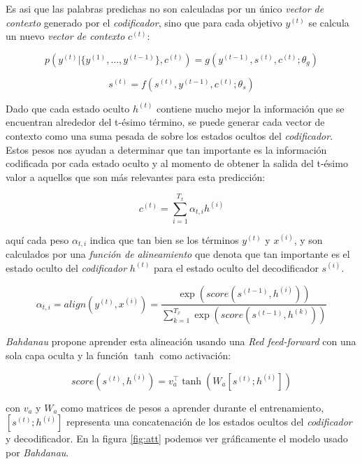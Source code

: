 Es asi que las palabras predichas no son calculadas por un único \textit{vector de contexto} generado por
el \textit{codificador}, sino que para cada objetivo $y^{(t)}$ se calcula un nuevo \textit{vector de contexto} $c^{(t)}$:

\begin{equation}
    p(y^{(t)} | \{y^{(1)}, \dots , y^{(t-1)}\}, c^{(t)}) = g(y^{(t-1)}, s^{(t)}, c^{(t)}; \theta_g)
\end{equation}

\begin{equation}
    s^{(t)} = f(s^{(t)}, y^{(t-1)}, c^{(t)}; \theta_s)
\end{equation}

Dado que cada estado oculto $h^{(t)}$ contiene mucho mejor la información que se encuentran alrededor
del t-ésimo término, se puede generar cada vector de contexto como una suma pesada de sobre los
estados ocultos del \textit{codificador}. Estos pesos nos ayudan a determinar que tan importante es la
información codificada por cada estado oculto y al momento de obtener la salida del t-ésimo valor
 a aquellos que son más relevantes para esta predicción:

\begin{equation}
    c^{(t)} = \sum_{i=1}^{T_x} \alpha_{t,i} h^{(i)}
\end{equation}

\noindent aquí cada peso $\alpha_{t,i}$ indica que tan bien se  los términos $y^{(t)}$ y $x^{(i)}$,
y son calculados por una \textit{función de alineamiento} que denota que tan importante es el estado
oculto del \textit{codificador} $h^{(t)}$ para el estado oculto del decodificador $s^{(i)}$.

\begin{equation}
    \alpha_{t,i} = align(y^{(t)}, x^{(i)}) = \frac{\exp(score(s^{(t-1)}, h^{(i)}))}{\sum_{k=1}^{T_x} \exp(score(s^{(t-1)}, h^{(k)}))}
    \label{eq:b_align}
\end{equation}

\textit{Bahdanau} propone aprender esta alineación usando una \textit{Red feed-forward} con una sola
capa oculta y la función $\tanh$ como activación:

\begin{equation}
    score(s^{(t)}, h^{(i)}) = v^\top_a \tanh(W_a[s^{(t)};h^{(i)}])
    \label{eq:concat}
\end{equation}

\noindent con $v_a$ y $W_a$ como matrices de pesos a aprender durante el entrenamiento, $[s^{(t)};h^{(i)}]$
representa una concatenación de los estados ocultos del \textit{codificador} y decodificador. En la figura
\ref{fig:att} podemos ver gráficamente el modelo usado por \textit{Bahdanau}.

